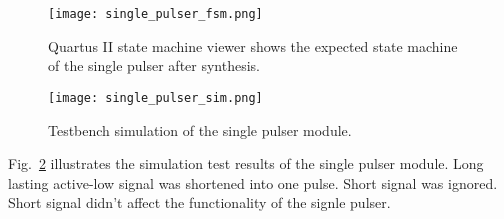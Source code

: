 \begin{figure}[htbp]
   \centering
   \texttt{[image: single\_pulser\_fsm.png]}
   \caption{Quartus II state machine viewer shows the expected state machine of the single pulser after synthesis.}
   \label{fig:single_pulser_fsm}
\end{figure}

\begin{figure}[htbp]
   \centerline{
   \texttt{[image: single\_pulser\_sim.png]}}
   \caption{Testbench simulation of the single pulser module.}
   \label{fig:single_pulser_sim}
\end{figure}

Fig.~\ref{fig:single_pulser_sim} illustrates the simulation test results of the single pulser module. Long lasting active-low signal was shortened into one pulse. Short signal was ignored. Short signal didn't affect the functionality of the signle pulser.
